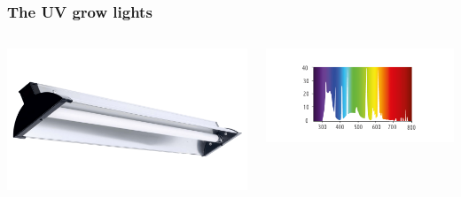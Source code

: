 \documentclass[
    12pt,
    aspectratio=1610,
    b,
    bibliography=../bibliography.bib,
    link-citations]{beamer}
\begin{document}
    \begin{frame}
        \frametitle{The UV grow lights}
        \begin{columns}[T]
            \begin{column}{.45\textwidth}
                \includegraphics[width=\linewidth]{LuxElite_PlantUV}
            \end{column}
            \begin{column}{.45\textwidth}
                \includegraphics[width=\linewidth]{LuxElite_PlantUV_light-spectrum}
            \end{column}
        \end{columns}
    \end{frame}
\end{document}
